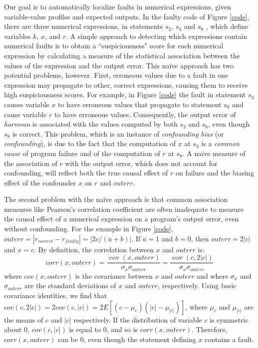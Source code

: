 \documentclass[times]{stvrauth}
\begin{document}
Our goal is to automatically localize faults in numerical expressions, given variable-value profiles and expected outputs.  In the faulty code of Figure \ref{code}, there are three numerical expressions, in statements $s_2$, $s_3$ and $s_8$ , which define variables $k$, $ x$, and $r$.  A simple approach to detecting which expressions contain numerical faults is to obtain a ``suspiciousness" score for each numerical expression by calculating a measure of the statistical association between the values of the expression and the output error. This na\"{i}ve approach has two potential problems, however.  First, erroneous values due to a fault in one expression may propagate to other, correct expressions, causing them to receive high suspiciousness scores.  For example, in Figure \ref{code} the fault in statement $s_3$ causes variable $x$ to have erroneous values that propagate to statement $s_8$ and cause variable $r$ to have erroneous values. Consequently, the output error of {\it harmean} is associated with the values computed by both $s_3$ and $s_8$, even though $s_8$  is correct.  This problem, which is an instance of {\it confounding bias} (or {\it confounding}), is due to the fact that the computation of $x$ at $s_3$ is a {\it common cause} of program failure and of the computation of $r$ at $s_8$.  A na\"{i}ve measure of the association of $r$ with the output error, which does not account for confounding, will reflect both the true causal effect of $r$ on failure and the biasing effect of the confounder $x$ on $r$ and $outerr$.

The second problem with the na\"{i}ve approach is that common association measures like Pearson's correlation coefficient \cite{Philip2012} are often inadequate to measure the causal effect of a numerical expression on a program's output error, even without confounding.  For the example in Figure \ref{code},  $outerr=|r_{correct}-r_{faulty} |=|2c/(a+b)|$.  If $a=1$ and $b=0$, then $outerr=2|c|$ and $x=c$.  By definition, the correlation between $x$ and $outerr$ is:
\begin{equation*}\label{correlation}
corr(x,outerr) = \frac{{{\mathop{ cov}} (x,outerr)}}{{{\sigma _x}{\sigma _{outerr}}}} = \frac{{{\mathop{ cov}} (c,2|c|)}}{{{\sigma _x}{\sigma _{outerr}}}}
\end{equation*}
where $cov(x,outerr)$ is the covariance between $x$ and $outerr$ and where $\sigma_x$ and $\sigma_{outerr}$ are the standard deviations of $x$ and $outerr$, respectively.  Using basic covariance identities, we find that $cov(c,2|c|)=2cov(c,|c|)=2E[(c-\mu_c )(|c|-\mu_{|c|})]$, where $\mu_c$ and $\mu_{|c|}$ are the means of $c$ and $|c|$ respectively.  If the distribution of variable $c$ is symmetric about 0, $cov(c,|c|)$ is equal to 0, and so is $corr(x,outerr)$. Therefore, $corr(x,outerr)$ can be 0, even though the statement defining $x$ contains a fault.
\end{document}
